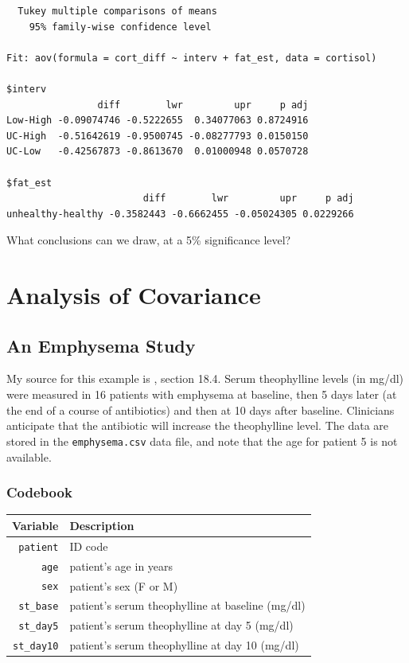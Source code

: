 \documentclass[]{book}
\theoremstyle{definition}
\theoremstyle{definition}
\theoremstyle{definition}
\theoremstyle{remark}
\begin{document}
\begin{verbatim}
  Tukey multiple comparisons of means
    95% family-wise confidence level

Fit: aov(formula = cort_diff ~ interv + fat_est, data = cortisol)

$interv
                diff        lwr         upr     p adj
Low-High -0.09074746 -0.5222655  0.34077063 0.8724916
UC-High  -0.51642619 -0.9500745 -0.08277793 0.0150150
UC-Low   -0.42567873 -0.8613670  0.01000948 0.0570728

$fat_est
                        diff        lwr         upr     p adj
unhealthy-healthy -0.3582443 -0.6662455 -0.05024305 0.0229266
\end{verbatim}

What conclusions can we draw, at a 5\% significance level?

\chapter{Analysis of Covariance}\label{analysis-of-covariance}

\section{An Emphysema Study}\label{an-emphysema-study}

My source for this example is \citet{Riffenburgh2006}, section 18.4.
Serum theophylline levels (in mg/dl) were measured in 16 patients with
emphysema at baseline, then 5 days later (at the end of a course of
antibiotics) and then at 10 days after baseline. Clinicians anticipate
that the antibiotic will increase the theophylline level. The data are
stored in the \texttt{emphysema.csv} data file, and note that the age
for patient 5 is not available.

\subsection{Codebook}\label{codebook}

\begin{longtable}[]{@{}rl@{}}
\toprule
Variable & Description\tabularnewline
\midrule
\endhead
\texttt{patient} & ID code\tabularnewline
\texttt{age} & patient's age in years\tabularnewline
\texttt{sex} & patient's sex (F or M)\tabularnewline
\texttt{st\_base} & patient's serum theophylline at baseline
(mg/dl)\tabularnewline
\texttt{st\_day5} & patient's serum theophylline at day 5
(mg/dl)\tabularnewline
\texttt{st\_day10} & patient's serum theophylline at day 10
(mg/dl)\tabularnewline
\bottomrule
\end{longtable}
\end{document}
